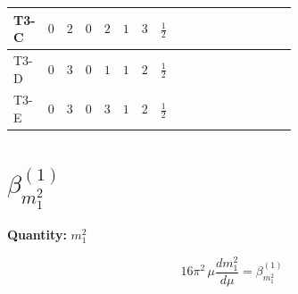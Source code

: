 \documentclass[8pt]{article}
\begin{document}
\begin{landscape}
\begin{longtable}{@{}llcccccc >{\raggedright\arraybackslash}p{0.21\linewidth} >{\raggedright\arraybackslash}p{0.21\linewidth} >{\raggedright\arraybackslash}p{0.21\linewidth}@{}}
\midrule
T3-C & $0$ & $2$ & $0$ & $2$ & $1$ & $3$ & $\frac{1}{2}$ & \scriptsize\adjustbox{max width=\linewidth}{$\begin{gathered} +\frac{3}{2} \left({Y_e}\,\left({Y_e}\right)^{\dagger}\,{Y_e}\right)_{ij}\end{gathered}$} & \scriptsize\adjustbox{max width=\linewidth}{$\begin{gathered} -\frac{9}{4} {g_2}^2 \left({Y_e}\right)_{ij}\end{gathered}$} & \scriptsize\adjustbox{max width=\linewidth}{$\begin{gathered} -\frac{15}{4} {g_1}^2 \left({Y_e}\right)_{ij}\end{gathered}$} \\
\midrule
T3-D & $0$ & $3$ & $0$ & $1$ & $1$ & $2$ & $\frac{1}{2}$ & \scriptsize\adjustbox{max width=\linewidth}{$\begin{gathered} +\frac{3}{2} \left({Y_e}\,\left({Y_e}\right)^{\dagger}\,{Y_e}\right)_{ij}\end{gathered}$} & \scriptsize\adjustbox{max width=\linewidth}{$\begin{gathered} -\frac{9}{4} {g_2}^2 \left({Y_e}\right)_{ij}\end{gathered}$} & \scriptsize\adjustbox{max width=\linewidth}{$\begin{gathered} -\frac{15}{4} {g_1}^2 \left({Y_e}\right)_{ij}\end{gathered}$} \\
\midrule
T3-E & $0$ & $3$ & $0$ & $3$ & $1$ & $2$ & $\frac{1}{2}$ & \scriptsize\adjustbox{max width=\linewidth}{$\begin{gathered} +\frac{3}{2} \left({Y_e}\,\left({Y_e}\right)^{\dagger}\,{Y_e}\right)_{ij}\end{gathered}$} & \scriptsize\adjustbox{max width=\linewidth}{$\begin{gathered} -\frac{9}{4} {g_2}^2 \left({Y_e}\right)_{ij}\end{gathered}$} & \scriptsize\adjustbox{max width=\linewidth}{$\begin{gathered} -\frac{15}{4} {g_1}^2 \left({Y_e}\right)_{ij}\end{gathered}$} \\
\midrule
\bottomrule
\end{longtable}
\clearpage
\section*{$\beta_{m_1^2}^{(1)}$}
\noindent\textbf{Quantity: }$m_1^2$\par\smallskip
\[16\pi^2\,\mu\frac{d m_1^2}{d\mu}=\beta_{m_1^2}^{(1)}\]

\end{landscape}
\end{document}
